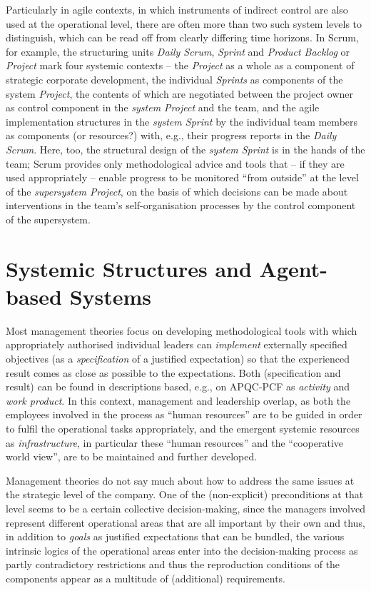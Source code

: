 \documentclass[11pt,a4paper]{article}
\begin{document}
Particularly in agile contexts, in which instruments of indirect control are
also used at the operational level, there are often more than two such system
levels to distinguish, which can be read off from clearly differing time
horizons.  In Scrum, for example, the structuring units \emph{Daily Scrum},
\emph{Sprint} and \emph{Product Backlog} or \emph{Project} mark four systemic
contexts -- the \emph{Project} as a whole as a component of strategic
corporate development, the individual \emph{Sprints} as components of the
system \emph{Project}, the contents of which are negotiated between the
project owner as control component in the \emph{system Project} and the team,
and the agile implementation structures in the \emph{system Sprint} by the
individual team members as components (or resources?) with, e.g., their
progress reports in the \emph{Daily Scrum}. Here, too, the structural design
of the \emph{system Sprint} is in the hands of the team; Scrum provides only
methodological advice and tools that -- if they are used appropriately --
enable progress to be monitored \enquote{from outside} at the level of the
\emph{supersystem Project}, on the basis of which decisions can be made about
interventions in the team's self-organisation processes by the control
component of the supersystem.

\section{Systemic Structures and Agent-based Systems}

Most management theories focus on developing methodological tools with which
appropriately authorised individual leaders can \emph{implement} externally
specified objectives (as a \emph{specification} of a justified expectation) so
that the experienced result comes as close as possible to the expectations.
Both (specification and result) can be found in descriptions based, e.g., on
APQC-PCF as \emph{activity} and \emph{work product}. In this context,
management and leadership overlap, as both the employees involved in the
process as \enquote{human resources} are to be guided in order to fulfil the
operational tasks appropriately, and the emergent systemic resources as
\emph{infrastructure}, in particular these \enquote{human resources} and the
\enquote{cooperative world view}, are to be maintained and further developed.

Management theories do not say much about how to address the same issues at the
strategic level of the company. One of the (non-explicit) preconditions at
that level seems to be a certain collective decision-making, since the
managers involved represent different operational areas that are all important
by their own and thus, in addition to \emph{goals} as justified expectations
that can be bundled, the various intrinsic logics of the operational areas
enter into the decision-making process as partly contradictory restrictions
and thus the reproduction conditions of the components appear as a multitude
of (additional) requirements.
\end{document}
